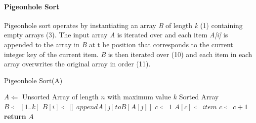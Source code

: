 \documentclass[12pt]{article}
\begin{document}
	\paragraph{Pigeonhole Sort}
	\label{ssec:pigeonhole}
	Pigeonhole sort operates by instantiating an array \textit{B} of length \textit{k} (1) containing empty arrays (3). The input array \textit{A} is iterated over and each item \textit{A[i]} is appended to the array in \textit{B} at t he position that corresponds to the current integer key of the current item. \textit{B} is then iterated over (10) and each item in each array overwrites the original array in order (11). 
	\begin{algorithm}[H] %
		\caption{Pigeonhole Sort({A})} %
		\label{alg1} %
		\begin{algorithmic}[1] %
			\REQUIRE $A \Leftarrow$ Unsorted Array of length $n$ with maximum value $k$
			\ENSURE Sorted Array
			\STATE $B \Leftarrow [1..k]$ 
			\STATE $B[i] \Leftarrow [$\space$]$ 
			\ENDFOR
			\STATE $append$\space$ A[j]$\space$ to$\space$ B[A[j]]$ 
			\ENDFOR
			\STATE $c \Leftarrow 1$ 
			\STATE $A[c] \Leftarrow item$ 
			\STATE $c \Leftarrow c + 1$		
			\ENDFOR
			\ENDFOR
			\STATE \textbf{return} $A$
		\end{algorithmic}
	\end{algorithm}

	\pagebreak
\end{document}
